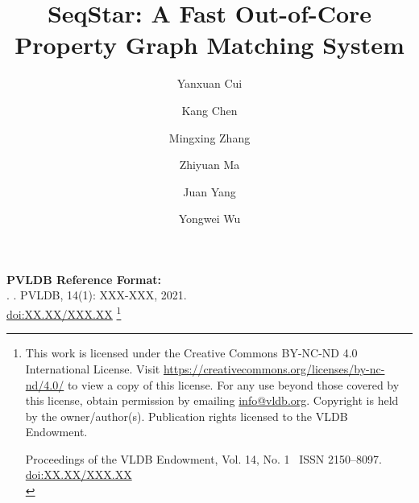 \documentclass[sigconf, nonacm]{acmart}
\newcommand\vldbdoi{XX.XX/XXX.XX}
\newcommand\vldbpages{XXX-XXX}
\newcommand\vldbvolume{14}
\newcommand\vldbissue{1}
\newcommand\vldbyear{2021}
\newcommand\vldbauthors{\authors}
\newcommand\vldbtitle{\shorttitle}
\newcommand\vldbpagestyle{plain}
\begin{document}
\title{SeqStar: A Fast Out-of-Core Property Graph Matching System}

\author{Yanxuan Cui}

\author{Kang Chen}

\author{Mingxing Zhang}

\author{Zhiyuan Ma}

\author{Juan Yang}

\author{Yongwei Wu}



\maketitle

\pagestyle{\vldbpagestyle}
\begingroup\small\noindent\raggedright\textbf{PVLDB Reference Format:}\\
\vldbauthors. \vldbtitle. PVLDB, \vldbvolume(\vldbissue): \vldbpages, \vldbyear.\\
\href{https://doi.org/\vldbdoi}{doi:\vldbdoi}
\endgroup
\begingroup
\renewcommand\thefootnote{}\footnote{\noindent
This work is licensed under the Creative Commons BY-NC-ND 4.0 International License. Visit \url{https://creativecommons.org/licenses/by-nc-nd/4.0/} to view a copy of this license. For any use beyond those covered by this license, obtain permission by emailing \href{mailto:info@vldb.org}{info@vldb.org}. Copyright is held by the owner/author\@(s). Publication rights licensed to the VLDB Endowment. \\
\raggedright{} Proceedings of the VLDB Endowment, Vol. \vldbvolume, No. \vldbissue\ %
ISSN 2150--8097. \\
\href{https://doi.org/\vldbdoi}{doi:\vldbdoi} \\
}\addtocounter{footnote}{-1}\endgroup
\end{document}
